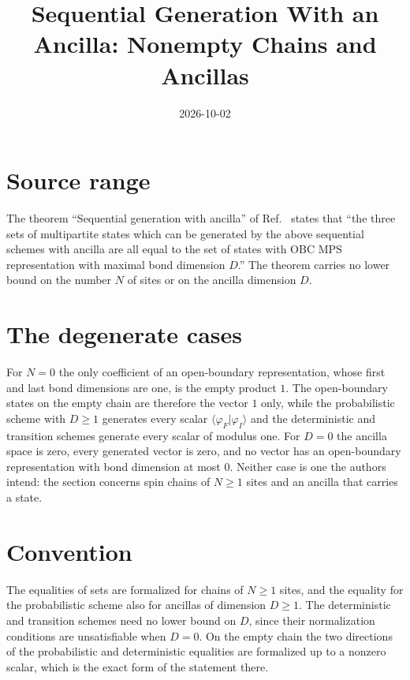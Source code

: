 \documentclass{article}
\title{Sequential Generation With an Ancilla: Nonempty Chains and Ancillas}
\author{}
\date{2026-10-02}
\begin{document}
\maketitle
{}

\section{Source range}

The theorem ``Sequential generation with ancilla'' of
Ref.~\cite[Section~5, lines~1569--1573]{PerezGarcia2007Matrix} states that
``the three sets of multipartite states which can be generated by the above
sequential schemes with ancilla are all equal to the set of states with OBC
MPS representation with maximal bond dimension $D$.'' The theorem carries no
lower bound on the number $N$ of sites or on the ancilla dimension $D$.

\section{The degenerate cases}

For $N=0$ the only coefficient of an open-boundary representation, whose
first and last bond dimensions are one, is the empty product $1$. The
open-boundary states on the empty chain are therefore the vector $1$ only,
while the probabilistic scheme with $D\ge1$ generates every scalar
$\langle\varphi_F|\varphi_I\rangle$ and the deterministic and transition
schemes generate every scalar of modulus one. For $D=0$ the ancilla space
is zero, every generated vector is zero, and no vector has an open-boundary
representation with bond dimension at most $0$. Neither case is one the
authors intend: the section concerns spin chains of $N\ge1$ sites and an
ancilla that carries a state.

\section{Convention}

The equalities of sets are formalized for chains of $N\ge1$ sites, and the
equality for the probabilistic scheme also for ancillas of dimension $D\ge1$.
The deterministic and transition schemes need no lower bound on $D$, since
their normalization conditions are unsatisfiable when $D=0$. On the empty
chain the two directions of the probabilistic and deterministic equalities
are formalized up to a nonzero scalar, which is the exact form of the
statement there.



\end{document}

